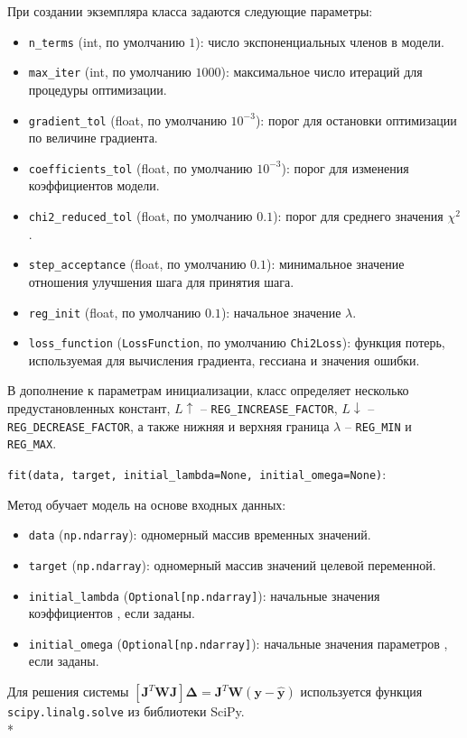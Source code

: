При создании экземпляра класса задаются следующие параметры:
\begin{itemize}
	\item \texttt{n\_terms} (int, по умолчанию $1$): число экспоненциальных членов в модели.
	\item \texttt{max\_iter} (int, по умолчанию $1000$): максимальное число итераций для процедуры оптимизации.
	\item \texttt{gradient\_tol} (float, по умолчанию $10^{-3}$): порог для остановки оптимизации по величине градиента.
	\item \texttt{coefficients\_tol} (float, по умолчанию $10^{-3}$): порог для изменения коэффициентов модели.
	\item \texttt{chi2\_reduced\_tol} (float, по умолчанию $0.1$): порог для среднего значения $\chi^2$.
	\item \texttt{step\_acceptance} (float, по умолчанию $0.1$): минимальное значение отношения улучшения шага для принятия шага.
	\item \texttt{reg\_init} (float, по умолчанию $0.1$): начальное значение $\lambda$.
	\item \texttt{loss\_function} (\texttt{LossFunction}, по умолчанию \texttt{Chi2Loss}): функция потерь, используемая для вычисления градиента, гессиана и значения ошибки.
\end{itemize}

В дополнение к параметрам инициализации, класс определяет несколько предустановленных констант, $L\uparrow$ -- \texttt{REG\_INCREASE\_FACTOR}, \linebreak $L\downarrow$ -- \texttt{REG\_DECREASE\_FACTOR}, а также нижняя и верхняя граница $\lambda$ -- \texttt{REG\_MIN} и \texttt{REG\_MAX}.

\texttt{fit(data, target, initial\_lambda=None, \linebreak initial\_omega=None)}:

Метод обучает модель на основе входных данных:
\begin{itemize}
	\item \texttt{data} (\texttt{np.ndarray}): одномерный массив временных значений.
	\item \texttt{target} (\texttt{np.ndarray}): одномерный массив значений целевой переменной.
	\item \texttt{initial\_lambda} (\texttt{Optional[np.ndarray]}): начальные значения коэффициентов , если заданы.
	\item \texttt{initial\_omega} (\texttt{Optional[np.ndarray]}): начальные значения параметров , если заданы.
\end{itemize}
Для решения системы $[\mathbf{J}^T\mathbf{W}\mathbf{J}]\boldsymbol{\Delta}=\mathbf{J}^T\mathbf{W}(\mathbf{y}-\mathbf{\hat{y}})$ используется функция \linebreak \texttt{scipy.linalg.solve} из библиотеки SciPy.
\\*

